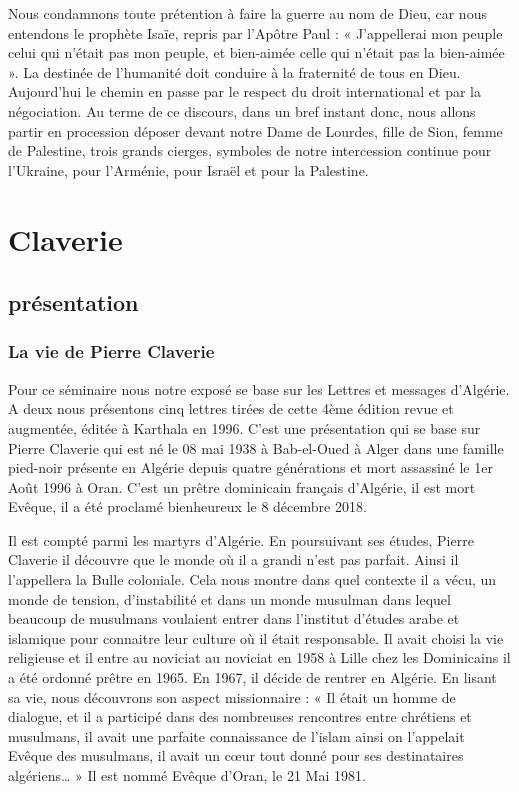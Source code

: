 \begin{itemize}
Nous condamnons toute prétention à faire la guerre au nom de Dieu, car nous entendons le prophète Isaïe, repris par l’Apôtre Paul : « J’appellerai mon peuple celui qui n’était pas mon peuple, et bien-aimée celle qui n’était pas la bien-aimée ». La destinée de l’humanité doit conduire à la fraternité de tous en Dieu. Aujourd’hui le chemin en passe par le respect du droit international et par la négociation. Au terme de ce discours, dans un bref instant donc, nous allons partir en procession déposer devant notre Dame de Lourdes, fille de Sion, femme de Palestine, trois grands cierges, symboles de notre intercession continue pour l’Ukraine, pour l’Arménie, pour Israël et pour la Palestine.
\end{itemize}




\chapter{Claverie}


\section{présentation}

\subsection{La vie de Pierre Claverie}


Pour ce séminaire nous notre exposé se base sur les Lettres et messages d’Algérie. A deux nous présentons cinq lettres tirées de cette 4ème édition revue et augmentée, éditée à Karthala en 1996.  C’est une présentation qui se base sur Pierre Claverie qui est né le 08 mai 1938 à Bab-el-Oued à Alger dans une famille pied-noir présente en Algérie depuis quatre générations et mort assassiné le 1er Août 1996 à Oran. C’est un prêtre dominicain français d’Algérie, il est mort Evêque, il a été proclamé bienheureux le 8 décembre 2018. 

Il est compté parmi les martyrs d’Algérie. En poursuivant ses études, Pierre Claverie il découvre que le monde où il a grandi n’est pas parfait. Ainsi il l’appellera la Bulle coloniale. Cela nous montre dans quel contexte il a vécu, un monde de tension, d’instabilité et dans un monde musulman dans lequel beaucoup de musulmans voulaient entrer dans l’institut d’études arabe et islamique pour connaitre leur culture où il était responsable. Il avait choisi la vie religieuse et il entre au noviciat au noviciat en 1958 à Lille chez les Dominicains il a été ordonné prêtre en 1965. En 1967, il décide de rentrer en Algérie. 
En lisant sa vie, nous découvrons son aspect missionnaire : « Il était un homme de dialogue, et il a participé dans des nombreuses rencontres entre chrétiens et musulmans, il avait une parfaite connaissance de l’islam ainsi on l’appelait Evêque des musulmans, il avait un cœur tout donné pour ses destinataires algériens… » Il est nommé Evêque d’Oran, le 21 Mai 1981.
 
